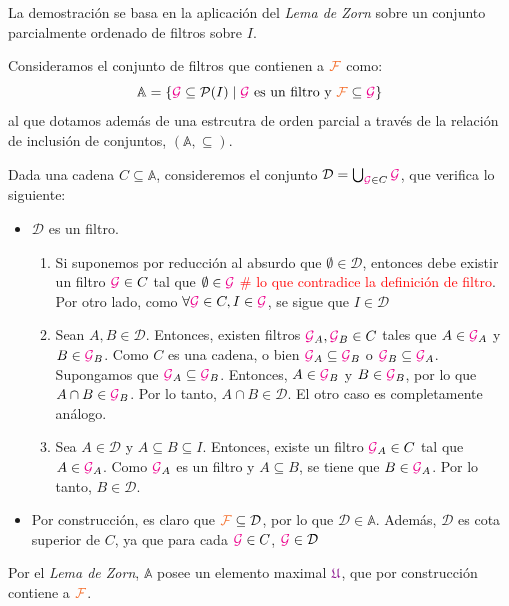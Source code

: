 \documentclass[titlepage,11pt,a4paper]{book}
\newcommand{\filt}{\ensuremath{\textcolor{Orange}{\mathcal{F}}}}
\newcommand{\gilt}{\ensuremath{\textcolor{Magenta}{\mathcal{G}}}}
\newcommand{\ultf}{\ensuremath{\textcolor{Plum}{\mathfrak{U}}}}
\begin{document}
\medskip
\begin{dem}
    La demostración se basa en la aplicación del \textit{Lema de Zorn} sobre un conjunto parcialmente ordenado de filtros sobre $I$.

    \medskip
    Consideramos el conjunto de filtros que contienen a $\filt$ como:
    \[
        \mathbb A = \{\gilt \subseteq \mathcal P(I) \mid \gilt \text{ es un filtro y } \filt \subseteq \gilt\}   
    \]
    al que dotamos además de una estrcutra de orden parcial a través de la relación de inclusión de conjuntos, $(\mathbb A, \subseteq)$.

    \smallskip
    Dada una cadena $C \subseteq \mathbb A$, consideremos el conjunto $\mathcal D = \bigcup_{\gilt \in C} \gilt$, que verifica lo siguiente:

    \begin{itemize}
        \item[$\bullet$]$\mathcal D$ es un filtro.
        \begin{enumerate}
            \item[(i)] Si suponemos por reducción al absurdo que $\emptyset \in \mathcal D$, entonces debe existir un filtro $\gilt \in C$ tal que $\emptyset \in \gilt$ \textcolor{red}{\# lo que contradice la definición de filtro}. Por otro lado, como $\forall \gilt \in C, I \in \gilt$, se sigue que $I \in \mathcal D$
            \item[(ii)] Sean $A, B \in \mathcal D$. Entonces, existen filtros $\gilt_{A}, \gilt_{B} \in C$ tales que $A \in \gilt_{A}$ y $B \in \gilt_{B}$. Como $C$ es una cadena, o bien $\gilt_{A} \subseteq \gilt_{B}$ o $\gilt_{B} \subseteq \gilt_{A}$. Supongamos que $\gilt_{A} \subseteq \gilt_{B}$. Entonces, $A \in \gilt_{B}$ y $B \in \gilt_{B}$, por lo que $A \cap B \in \gilt_{B}$. Por lo tanto, $A \cap B \in \mathcal D$. El otro caso es completamente análogo.
            \item[(iii)] Sea $A \in \mathcal D$ y $A \subseteq B \subseteq I$. Entonces, existe un filtro $\gilt_{A} \in C$ tal que $A \in \gilt_{A}$. Como $\gilt_{A}$ es un filtro y $A \subseteq B$, se tiene que $B \in \gilt_{A}$. Por lo tanto, $B \in \mathcal D$.
        \end{enumerate}

        \smallskip
        \item[$\bullet$] Por construcción, es claro que $\filt \subseteq \mathcal D$, por lo que $\mathcal D \in \mathbb A$. Además, $\mathcal D$ es cota superior de $C$, ya que para cada $\gilt \in C$, $\gilt \in \mathcal D$ 
    \end{itemize}

    \medskip
    Por el \textit{Lema de Zorn}, $\mathbb A$ posee un elemento maximal $\ultf$, que por construcción contiene a $\filt$.
\end{dem}
\end{document}
